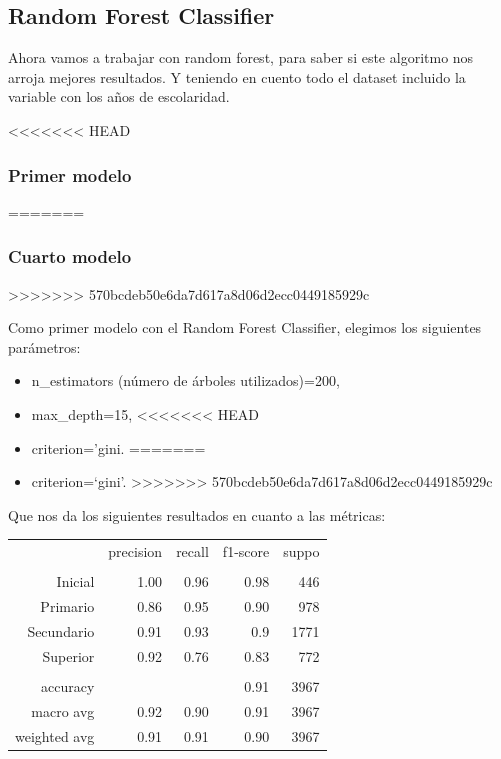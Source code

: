 \documentclass[a4paper]{article}
\begin{document}
    \subsection{Random Forest Classifier}
        
        Ahora vamos a trabajar con random forest, para saber si este algoritmo nos arroja mejores resultados. Y teniendo en cuento todo el dataset incluido la variable con los años de escolaridad. 

<<<<<<< HEAD
        \subsubsection{Primer modelo}
=======
        \subsubsection{Cuarto modelo}
>>>>>>> 570bcdeb50e6da7d617a8d06d2ecc0449185929c

            Como primer modelo con el Random Forest Classifier, elegimos los siguientes parámetros:
            \begin{itemize}
                \item n\_estimators (número de árboles utilizados)=200,
                \item max\_depth=15,
<<<<<<< HEAD
                \item criterion='gini.
=======
                \item criterion=`gini'.
>>>>>>> 570bcdeb50e6da7d617a8d06d2ecc0449185929c
            \end{itemize}

            Que nos da los siguientes resultados en cuanto a las métricas:
            \begin{table}[H]
                \centering
                \begin{tabular}{rrrrr}
                    ~ & precision & recall & f1-score & suppo \\
                    & & & & \\
                    Inicial    & 1.00 & 0.96 & 0.98 & 446 \\
                    Primario   & 0.86 & 0.95 & 0.90 & 978 \\
                    Secundario & 0.91 & 0.93 & 0.9 & 1771 \\
                    Superior   & 0.92 & 0.76 & 0.83 & 772 \\
                    & & & & \\
                    accuracy & & & 0.91 & 3967 \\
                    macro avg & 0.92 & 0.90 & 0.91 & 3967 \\
                    weighted avg & 0.91 & 0.91 & 0.90 & 3967 \\
                \end{tabular}
            \end{table}
\end{document}
